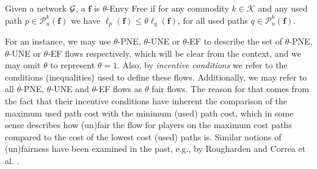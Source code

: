\begin{definition}[$\theta$-EF]\label{def:ApproxEF}
Given a network $\mathcal{G}$, a {\pathdecomp} $\bm{f}$ is $\theta$-Envy Free if for any commodity $k\in \mathcal{K}$ and any used path $p\in \mathcal{P}_u^k(\bm{f})$ we have $\ell_p(\bm{f}) \leq \theta \ell_q(\bm{f})$, for all used paths $q\in \mathcal{P}_u^k(\bm{f})$. 
\end{definition} 

For an instance, we may use $\theta$-PNE, $\theta$-UNE or $\theta$-EF to describe the set of $\theta$-PNE, $\theta$-UNE or $\theta$-EF flows respectively, which will be clear from the context, and we may omit $\theta$ to represent $\theta=1$. Also, by \emph{incentive conditions} we refer to the conditions (inequalities) used to define these flows. Additionally, we may refer to all $\theta$-PNE, $\theta$-UNE and $\theta$-EF flows as $\theta$ fair flows.  The reason for that comes from the fact that their incentive  conditions have inherent the comparison of the maximum used path cost with the minimum (used) path cost, which in some sense describes how (un)fair the flow for players on the maximum cost paths compared to the cost of the lowest cost (used) paths is. Similar notions of (un)fairness have been examined in the past, e.g., by Rougharden \cite{roughgarden2002unfair} and Correa et al. \cite{correa2007fast}. 
 



